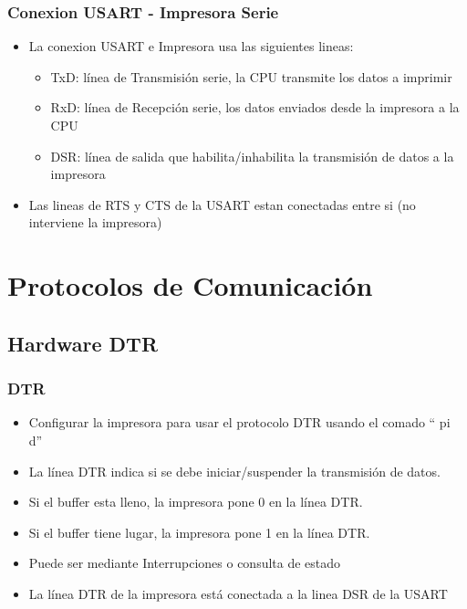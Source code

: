 \documentclass{beamer}
\begin{document}
\begin{frame}[fragile]
\frametitle{Conexion USART - Impresora Serie}
\begin{itemize}
 \item La conexion USART e Impresora usa las siguientes lineas:
 \begin{itemize}
  \item TxD: línea de Transmisión serie, la CPU transmite los datos a imprimir
  \item RxD: línea de Recepción serie, los datos enviados desde la impresora a la CPU
  \item DSR: línea de salida que habilita/inhabilita la transmisión de datos a la impresora
\end{itemize}
\item Las lineas de RTS y CTS de la USART estan conectadas entre si (no interviene la impresora)
\end{itemize}
\end{frame}

\section{Protocolos de Comunicación}
\subsection{Hardware DTR}
\begin{frame}[fragile]
\frametitle{DTR}
\begin{itemize}
 \item Configurar la impresora para usar el protocolo DTR usando el comado `` pi d'' 
 \item La línea DTR indica si se debe iniciar/suspender la transmisión de datos.
 \item Si el buffer esta lleno, la impresora pone 0 en la línea DTR.
 \item Si el buffer tiene lugar, la impresora pone 1 en la línea DTR.
 \item Puede ser mediante Interrupciones o consulta de estado
 \item La línea DTR de la impresora está conectada a la linea DSR de la USART
\end{itemize}

\end{frame}
\end{document}

